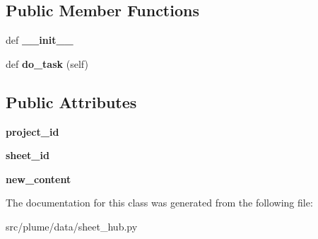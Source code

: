 \subsection*{Public Member Functions}
\begin{DoxyCompactItemize}
\item 
def {\bfseries \+\_\+\+\_\+init\+\_\+\+\_\+}\hypertarget{classplume-creator_1_1src_1_1plume_1_1data_1_1sheet__hub_1_1_set_content_a2756c530af4abc0a2747bd8077bd4378}{}\label{classplume-creator_1_1src_1_1plume_1_1data_1_1sheet__hub_1_1_set_content_a2756c530af4abc0a2747bd8077bd4378}

\item 
def {\bfseries do\+\_\+task} (self)\hypertarget{classplume-creator_1_1src_1_1plume_1_1data_1_1sheet__hub_1_1_set_content_a230629f9acc6ddd9b30a23ae2fdb331b}{}\label{classplume-creator_1_1src_1_1plume_1_1data_1_1sheet__hub_1_1_set_content_a230629f9acc6ddd9b30a23ae2fdb331b}

\end{DoxyCompactItemize}
\subsection*{Public Attributes}
\begin{DoxyCompactItemize}
\item 
{\bfseries project\+\_\+id}\hypertarget{classplume-creator_1_1src_1_1plume_1_1data_1_1sheet__hub_1_1_set_content_a36571560bdbf9ba4b0094325862fbb4d}{}\label{classplume-creator_1_1src_1_1plume_1_1data_1_1sheet__hub_1_1_set_content_a36571560bdbf9ba4b0094325862fbb4d}

\item 
{\bfseries sheet\+\_\+id}\hypertarget{classplume-creator_1_1src_1_1plume_1_1data_1_1sheet__hub_1_1_set_content_ad574b2fcebc90aa29c8a8b5249e6c92b}{}\label{classplume-creator_1_1src_1_1plume_1_1data_1_1sheet__hub_1_1_set_content_ad574b2fcebc90aa29c8a8b5249e6c92b}

\item 
{\bfseries new\+\_\+content}\hypertarget{classplume-creator_1_1src_1_1plume_1_1data_1_1sheet__hub_1_1_set_content_abcdb5e30e88057ade4f11b7be80e590b}{}\label{classplume-creator_1_1src_1_1plume_1_1data_1_1sheet__hub_1_1_set_content_abcdb5e30e88057ade4f11b7be80e590b}

\end{DoxyCompactItemize}


The documentation for this class was generated from the following file\+:\begin{DoxyCompactItemize}
\item 
src/plume/data/sheet\+\_\+hub.\+py\end{DoxyCompactItemize}
